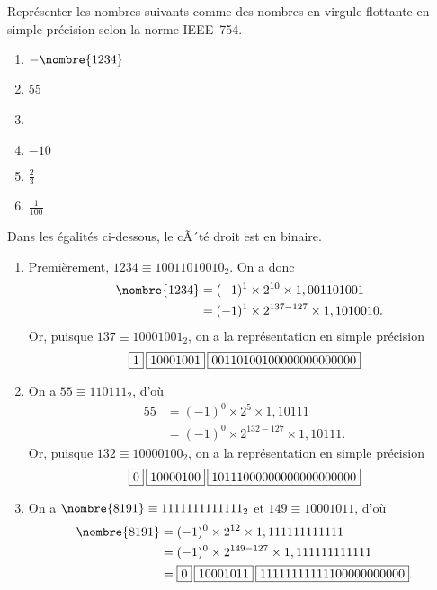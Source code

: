 \begin{exercice}
  Représenter les nombres suivants comme des nombres en virgule
  flottante en simple précision selon la norme IEEE~754.
  \begin{enumerate}
  \item $-\nombre{1234}$
  \item 55
  \item {}
  \item $-10$
  \item $\frac{2}{3}$
  \item $\frac{1}{100}$
  \end{enumerate}
  \begin{sol}
    Dans les égalités ci-dessous, le cÃ´té droit est en binaire.
    \begin{enumerate}
    \item Premièrement, $1234 \equiv 10011010010_2$. On a donc
      \begin{align*}
        -\nombre{1234}
        &= (-1)^1 \times 2^{10} \times 1,001101001 \\
        &= (-1)^1 \times 2^{137 - 127} \times 1,1010010.
      \end{align*}
      Or, puisque $137 \equiv 10001001_2$, on a la représentation en
      simple précision
      \begin{displaymath}
        \fbox{$1$}\hspace{2pt}\fbox{$10001001$}\hspace{2pt}\fbox{$00110100100000000000000$}
      \end{displaymath}
    \item On a $55 \equiv 110111_2$, d'où
      \begin{align*}
        55
        &= (-1)^0 \times 2^5 \times 1,10111 \\
        &= (-1)^0 \times 2^{132 - 127} \times 1,10111.
      \end{align*}
      Or, puisque $132 \equiv 10000100_2$, on a la représentation en
      simple précision
      \begin{displaymath}
        \fbox{$0$}\hspace{2pt}\fbox{$10000100$}\hspace{2pt}\fbox{$10111000000000000000000$}
      \end{displaymath}
    \item On a $\nombre{8191} \equiv 1111111111111_2$ et $149 \equiv
      10001011$, d'où
      \begin{align*}
        \nombre{8191}
        &= (-1)^0 \times 2^{12} \times 1,111111111111 \\
        &= (-1)^0 \times 2^{149 - 127} \times 1,111111111111 \\
        &= \ieee{0}{10001011}{11111111111100000000000}.

\end{align*}
\end{enumerate}
\end{sol}
\end{exercice}
